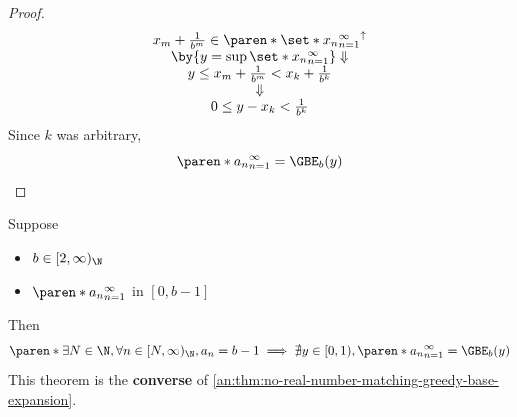\begin{proof}
\[\begin{array}{c}
      x_{m} + \frac{1}{b^{m}} \in \paren*{\set*{x_{n}}_{n = 1}^{\infty}}^{\uparrow} \\
      \by{\ensuremath{y = \sup \set*{x_{n}}_{n = 1}^{\infty}}} \Downarrow           \\
      y \leq x_{m} + \frac{1}{b^{m}} < x_{k} + \frac{1}{b^{k}}                      \\
      \Downarrow                                                                    \\
      0 \leq y - x_{k} < \frac{1}{b^{k}}
    \end{array}
  \]
  Since $k$ was arbitrary,
  \[
    \paren*{a_{n}}_{n = 1}^{\infty} = \GBE_{b}(y)
  \]
\end{proof}

\bigskip

\begin{theorem} \label{an:thm:no-real-number-matching-greedy-base-expansion-converse}
  Suppose
  \begin{itemize}
    \item $b \in [2, \infty)_{\N}$
    \item $\paren*{a_{n}}_{n = 1}^{\infty}$ in $[0, b - 1]$
  \end{itemize}
  Then
  \[
    \paren*{\exists N \in \N, \forall n \in [N, \infty)_{\N}, a_{n} = b - 1}
    \implies \nexists y \in [0, 1), \paren*{a_{n}}_{n = 1}^{\infty} = \GBE_{b}(y)
  \]
  This theorem is the \textbf{converse} of \cref{an:thm:no-real-number-matching-greedy-base-expansion}.
\end{theorem}

